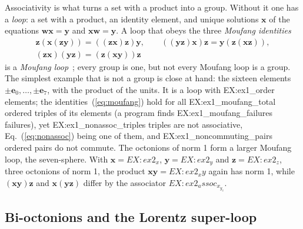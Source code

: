 \documentclass[aps,prd,twocolumn,superscriptaddress,nofootinbib,floatfix,longbibliography]{revtex4-2}
\newcommand{\e}[1]{\mathbf e_{#1}}
\begin{document}
Associativity is what turns a set with a product into a group. Without it one has a \emph{loop}: a set with a product,
an identity element, and unique solutions $\mathbf x$ of the equations $\mathbf w\mathbf x=\mathbf y$ and $\mathbf
x\mathbf w=\mathbf y$. A loop that obeys the three \emph{Moufang identities}
\begin{equation}
\begin{gathered}
\mathbf z(\mathbf x(\mathbf z\mathbf y))=((\mathbf z\mathbf x)\mathbf z)\mathbf y,\qquad
((\mathbf y\mathbf z)\mathbf x)\mathbf z=\mathbf y(\mathbf z(\mathbf x\mathbf z)),\\
(\mathbf z\mathbf x)(\mathbf y\mathbf z)=(\mathbf z(\mathbf x\mathbf y))\mathbf z
\end{gathered}
\label{eq:moufang}
\end{equation}
is a \emph{Moufang loop}~\cite{Moufang1935}; every group is one, but not every Moufang loop is a group. The simplest
example that is not a group is close at hand: the sixteen elements $\pm\e0,\dots,\pm\e7$, with the product of the
units. It is a loop with {{EX:ex1_order}} elements; the identities~(\ref{eq:moufang}) hold for all {{EX:ex1_moufang_total}}
ordered triples of its elements (a program finds {{EX:ex1_moufang_failures}} failures), yet {{EX:ex1_nonassoc_triples}} triples are not
associative, Eq.~(\ref{eq:nonassoc}) being one of them, and {{EX:ex1_noncommuting_pairs}} ordered pairs do not commute.
The octonions of norm 1 form a larger Moufang loop, the seven-sphere. With $\mathbf x={{EX:ex2_x}}$,
$\mathbf y={{EX:ex2_y}}$ and $\mathbf z={{EX:ex2_z}}$, three octonions of norm 1, the product $\mathbf x\mathbf y=
{{EX:ex2_xy}}$ again has norm 1, while $(\mathbf x\mathbf y)\mathbf z$ and $\mathbf x(\mathbf y\mathbf z)$ differ by the
associator ${{EX:ex2_assoc_x_y_z}}$.

\subsection{Bi-octonions and the Lorentz super-loop}
\label{sec:bioct}
\end{document}
